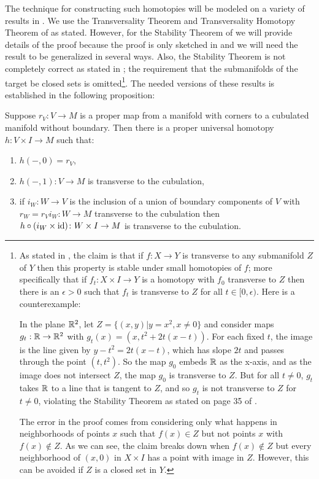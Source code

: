  The technique for constructing such homotopies will be modeled on a variety of results in \cite{GuPo74}. We use the Transversality Theorem and Transversality Homotopy Theorem of \cite[Section 2.3]{GuPo74} as stated. However, for the Stability Theorem of \cite[Section 1.6]{GuPo74} we will provide details of the proof because the proof is only sketched in \cite{GuPo74} and we will need the result to be generalized in several ways. Also, the Stability Theorem is not completely correct as stated in \cite[Section 1.6]{GuPo74}; the requirement that the submanifolds of the target be closed sets is omitted\footnote{As stated in \cite{GuPo74}, the claim is that if $f:X \to Y$ is transverse to any submanifold $Z$ of $Y$ then this property is stable under small homotopies of $f$; more specifically that if $f_t:X \times I \to Y$ is a homotopy with $f_0$ transverse to $Z$ then there is an $\epsilon>0$ such that $f_t$ is transverse to $Z$ for all $t\in[0,\epsilon)$. Here is a counterexample:

In the plane $\mathbb{R}^2$, let $Z = \{(x,y)|y = x^2, x\neq 0\}$ and consider maps $g_t: \mathbb{R} \to \mathbb{R}^2$ with
$g_t(x) = (x,t^2+2t(x-t))$. For each fixed $t$, the image is the line given by $y-t^2 = 2t(x-t)$, which has slope $2t$ and passes through the point $(t,t^2)$. So the map $g_0$ embeds $\mathbb{R}$ as the x-axis, and as the image does not intersect $Z$, the map $g_0$ is transverse to $Z$. But for all $t\neq 0$, $g_t$ takes $\mathbb{R}$ to a line that is tangent to $Z$, and so $g_t$ is not transverse to $Z$ for $t\neq 0$, violating the Stability Theorem as stated on page 35 of \cite{GuPo74}.

The error in the proof comes from considering only what happens in neighborhoods of points $x$ such that $f(x) \in Z$ but not points $x$ with $f(x)\notin Z$. As we can see, the claim breaks down when $f(x)\notin Z$ but every neighborhood of $(x,0)$ in $X \times I$ has a point with image in $Z$. However, this can be avoided if $Z$ is a closed set in $Y$.}. The needed versions of these results is established in the following proposition:

\begin{proposition}\label{P: ball stability}
Suppose $r_V \colon V \to M$ is a proper map from a manifold with corners to a cubulated manifold without boundary. Then there is a proper universal homotopy $h \colon V \times I \to M$ such that:
\begin{enumerate}
\item $h(-,0) = r_V$,

\item $h(-,1) \colon V \to M$ is transverse to the cubulation,

\item if $i_W \colon W \to V$ is the inclusion of a union of boundary components of $V$ with $r_W = r_Vi_W \colon W \to M$ transverse to the cubulation then $h\circ(i_{W} \times \mathrm{id}) \colon W \times I \to M$ is transverse to the cubulation.

\end{enumerate}
\end{proposition}

